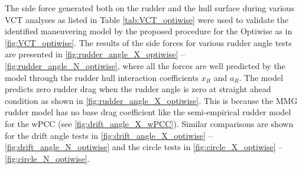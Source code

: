 The side force generated both on the rudder and the hull surface during various VCT analyses as listed in Table \ref{tab:VCT_optiwise} were used to validate the identified maneuvering model by the proposed procedure for the Optiwise as in \autoref{fig:VCT_optiwise}. The results of the side forces for various rudder angle tests are presented in \autoref{fig:rudder_angle_X_optiwise} -- \autoref{fig:rudder_angle_N_optiwise}, where all the forces are well predicted by the model through the rudder hull interaction coefficients $x_R$ and $a_R$. 
The model predicts zero rudder drag when the rudder angle is zero at straight ahead condition as shown in \autoref{fig:rudder_angle_X_optiwise}. This is because the MMG rudder model has no base drag coefficient like the semi-empirical rudder model for the wPCC (see \autoref{fig:drift_angle_X_wPCC}).
Similar comparisons are shown for the drift angle tests in \autoref{fig:drift_angle_X_optiwise} -- \autoref{fig:drift_angle_N_optiwise} and the circle tests in \autoref{fig:circle_X_optiwise} -- \autoref{fig:circle_N_optiwise}. 


